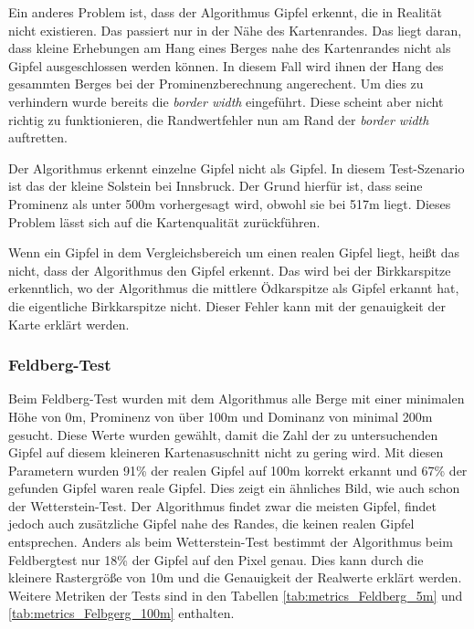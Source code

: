 Ein anderes Problem ist, dass der Algorithmus Gipfel erkennt, die in Realität nicht existieren. Das passiert nur in der Nähe des Kartenrandes. Das liegt daran, dass kleine Erhebungen am Hang eines Berges nahe des Kartenrandes nicht als Gipfel ausgeschlossen  werden können. In diesem Fall wird ihnen der Hang des gesammten Berges bei der Prominenzberechnung angerechent.  Um dies zu verhindern wurde bereits die \textit{border width} eingeführt. Diese scheint aber nicht richtig zu funktionieren, die Randwertfehler nun am Rand der \textit{border width} auftretten.


Der Algorithmus erkennt einzelne Gipfel nicht als Gipfel. In diesem Test-Szenario ist das der kleine Solstein bei Innsbruck. Der Grund hierfür ist, dass seine Prominenz als unter 500m vorhergesagt wird, obwohl sie bei 517m liegt. Dieses Problem lässt sich auf die Kartenqualität zurückführen. 

Wenn ein Gipfel in dem Vergleichsbereich um einen realen Gipfel liegt, heißt das nicht, dass der Algorithmus den Gipfel erkennt. Das wird bei der Birkkarspitze erkenntlich, wo der Algorithmus die mittlere Ödkarspitze als Gipfel erkannt hat, die eigentliche Birkkarspitze nicht. Dieser Fehler kann mit der genauigkeit der Karte erklärt werden. 

\subsubsection{Feldberg-Test}
Beim Feldberg-Test wurden mit dem Algorithmus alle Berge mit einer minimalen Höhe von 0m, Prominenz von über 100m und Dominanz von minimal 200m gesucht. Diese Werte wurden gewählt, damit die Zahl der zu untersuchenden Gipfel auf diesem kleineren Kartenasuschnitt nicht zu gering wird. Mit diesen Parametern wurden 91\% der realen Gipfel auf 100m korrekt erkannt und 67\% der gefunden Gipfel waren reale Gipfel. Dies zeigt ein ähnliches Bild, wie auch schon der Wetterstein-Test. Der Algorithmus findet zwar die meisten Gipfel, findet jedoch auch zusätzliche Gipfel nahe des Randes, die keinen realen Gipfel entsprechen. Anders als beim Wetterstein-Test bestimmt der Algorithmus beim Feldbergtest nur 18\% der Gipfel auf den Pixel genau. Dies kann durch die kleinere Rastergröße von 10m und die Genauigkeit der Realwerte erklärt werden. Weitere Metriken der Tests sind in den Tabellen \ref{tab:metrics_Feldberg_5m} und \ref{tab:metrics_Felbgerg_100m} enthalten.

